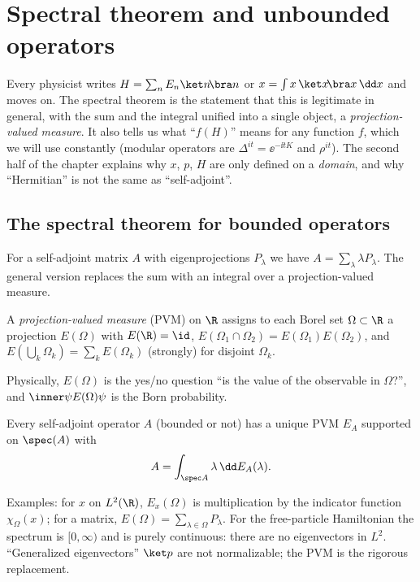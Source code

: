 \chapter{Spectral theorem and unbounded operators}\label{ch:spectral}

\begin{physmotiv}
Every physicist writes $H=\sum_nE_n\ket n\!\bra n$ or $x=\int x\,\ket x\!\bra x\,\dd x$ and moves on. The spectral theorem is the statement that this is legitimate in general, with the sum and the integral unified into a single object, a \emph{projection-valued measure}. It also tells us what ``$f(H)$'' means for any function $f$, which we will use constantly (modular operators are $\Delta^{it}=\ee^{-\ii tK}$ and $\rho^{it}$). The second half of the chapter explains why $x$, $p$, $H$ are only defined on a \emph{domain}, and why ``Hermitian'' is not the same as ``self-adjoint''.
\end{physmotiv}

\section{The spectral theorem for bounded operators}

For a self-adjoint matrix $A$ with eigenprojections $P_\lambda$ we have $A=\sum_\lambda\lambda P_\lambda$. The general version replaces the sum with an integral over a projection-valued measure.

\begin{definition}
A \emph{projection-valued measure} (PVM) on $\R$ assigns to each Borel set $\Omega\subset\R$ a projection $E(\Omega)$ with $E(\R)=\id$, $E(\Omega_1\cap\Omega_2)=E(\Omega_1)E(\Omega_2)$, and $E(\bigcup_k\Omega_k)=\sum_kE(\Omega_k)$ (strongly) for disjoint $\Omega_k$.
\end{definition}

Physically, $E(\Omega)$ is the yes/no question ``is the value of the observable in $\Omega$?'', and $\inner\psi{E(\Omega)\psi}$ is the Born probability.

\begin{theorem}\label{thm:spectral}
Every self-adjoint operator $A$ (bounded or not) has a unique PVM $E_A$ supported on $\spec(A)$ with
\begin{equation}
A=\int_{\spec A}\lambda\,\dd E_A(\lambda).
\end{equation}
\end{theorem}

Examples: for $x$ on $L^2(\R)$, $E_x(\Omega)$ is multiplication by the indicator function $\chi_\Omega(x)$; for a matrix, $E(\Omega)=\sum_{\lambda\in\Omega}P_\lambda$. For the free-particle Hamiltonian the spectrum is $[0,\infty)$ and is purely continuous: there are no eigenvectors in $L^2$. ``Generalized eigenvectors'' $\ket p$ are not normalizable; the PVM is the rigorous replacement.

